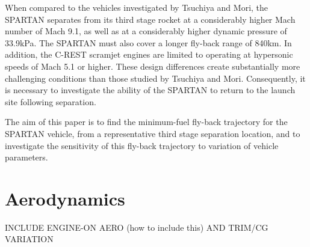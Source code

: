 \documentclass{article}
\begin{document}
When compared to the vehicles investigated by Tsuchiya and Mori\cite{Tsuchiya2005}, the SPARTAN separates from its third stage rocket at a considerably higher Mach number of Mach 9.1, as well as at a considerably higher dynamic pressure of 33.9kPa. The SPARTAN must also cover a longer fly-back range of 840km. In addition, the C-REST scramjet engines are limited to operating at hypersonic speeds of Mach 5.1 or higher. These design differences create substantially more challenging conditions than those studied by Tsuchiya and Mori. Consequently, it is necessary to investigate the ability of the SPARTAN to return to the launch site following separation. 

The aim of this paper is to find the minimum-fuel fly-back trajectory for the SPARTAN vehicle, from a representative third stage separation location, and to investigate the sensitivity of this fly-back trajectory to variation of vehicle parameters. 











\section{Aerodynamics}\label{sec:aero}
INCLUDE ENGINE-ON AERO (how to include this)
AND TRIM/CG VARIATION
\end{document}
